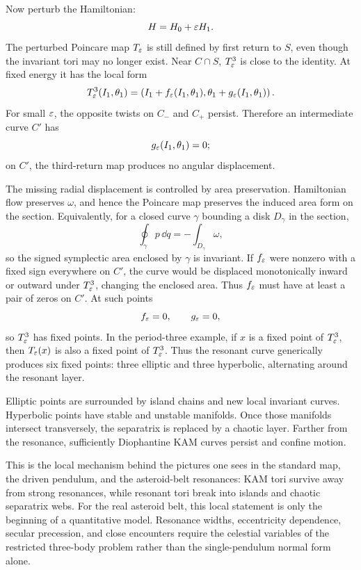 Now perturb the Hamiltonian:
\[
  H=H_0+\varepsilon H_1.
\]
The perturbed Poincare map \(T_\varepsilon\) is still defined by first return to
\(S\), even though the invariant tori may no longer exist. Near
\(C\cap S\), \(T_\varepsilon^3\) is close to the identity. At fixed energy it has the
local form
\[
  T_\varepsilon^3(I_1,\theta_1)
  =
  \left(
    I_1+f_\varepsilon(I_1,\theta_1),
    \theta_1+g_\varepsilon(I_1,\theta_1)
  \right).
\]
For small \(\varepsilon\), the opposite twists on \(C_-\) and \(C_+\) persist.
Therefore an intermediate curve \(C'\) has
\[
  g_\varepsilon(I_1,\theta_1)=0;
\]
on \(C'\), the third-return map produces no angular displacement.

The missing radial displacement is controlled by area preservation. Hamiltonian
flow preserves \(\omega\), and hence the Poincare map preserves the induced
area form on the section. Equivalently, for a closed curve \(\gamma\) bounding
a disk \(D_\gamma\) in the section,
\[
  \oint_\gamma p\,\dd q
  =
  -\int_{D_\gamma}\omega,
\]
so the signed symplectic area enclosed by \(\gamma\) is invariant. If
\(f_\varepsilon\) were nonzero with a fixed sign everywhere on \(C'\), the curve
would be displaced monotonically inward or outward under \(T_\varepsilon^3\), changing
the enclosed area. Thus \(f_\varepsilon\) must have at least a pair of zeros on
\(C'\). At such points
\[
  f_\varepsilon=0,
  \qquad
  g_\varepsilon=0,
\]
so \(T_\varepsilon^3\) has fixed points. In the period-three example, if \(x\) is a
fixed point of \(T_\varepsilon^3\), then \(T_\varepsilon(x)\) is also a fixed point of
\(T_\varepsilon^3\). Thus the resonant curve generically produces six fixed points:
three elliptic and three hyperbolic, alternating around the resonant layer.

Elliptic points are surrounded by island chains and new local invariant curves.
Hyperbolic points have stable and unstable manifolds. Once those manifolds
intersect transversely, the separatrix is replaced by a chaotic layer. Farther
from the resonance, sufficiently Diophantine KAM curves persist and confine
motion.

This is the local mechanism behind the pictures one sees in the standard map,
the driven pendulum, and the asteroid-belt resonances: KAM tori survive away
from strong resonances, while resonant tori break into islands and chaotic
separatrix webs.
For the real asteroid belt, this local statement is only the beginning of a
quantitative model. Resonance widths, eccentricity dependence, secular
precession, and close encounters require the celestial variables of the
restricted three-body problem rather than the single-pendulum normal form alone.

